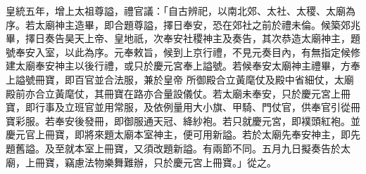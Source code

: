 \begin{pinyinscope}
 皇統五年，增上太祖尊謚，禮官議：「自古辨祀，以南北郊、太社、太稷、太廟為序。若太廟神主造畢，即合題尊謚，擇日奉安，恐在郊社之前於禮未倫。候築郊兆畢，擇日奏告昊天上帝、皇地祇，次奉安社稷神主及奏告，其次恭造太廟神主，題號奉安入室，以此為序。元奉敕旨，候到上京行禮，不見元奏目內，有無指定候修建太廟奉安神主以後行禮，或只於慶元宮奉上謚號。若候奉安太廟神主禮畢，方奉上謚號冊寶，即百官並合法服，兼於皇帝
 所御殿合立黃麾仗及殿中省細仗，太廟殿前亦合立黃麾仗，其冊寶在路亦合量設儀仗。若太廟未奉安，只於慶元宮上冊寶，即行事及立班官並用常服，及依例量用大小旗、甲騎、門仗官，供奉官引從冊寶彩服。若奉安後發冊，即御服通天冠、絳紗袍。若只就慶元宮，即襆頭紅袍。並慶元官上冊寶，即將來題太廟本室神主，便可用新謚。若於太廟先奉安神主，即先題舊謚。及至就本室上冊寶，又須改題新謚。有兩節不同。五月九日擬奏告於太廟，上冊寶，竊慮法物樂舞難辦，只於慶元宮上冊寶。」從之。




\end{pinyinscope}
